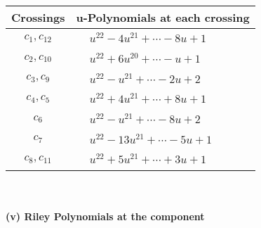 \documentclass[1p]{elsarticle_modified}
\theoremstyle{definition}
\begin{document}
\begin{tabular}{m{50pt}|m{274pt}}
Crossings & \hspace{64pt}u-Polynomials at each crossing \\
\hline $$\begin{aligned}c_{1},c_{12}\end{aligned}$$&$\begin{aligned}
&u^{22}-4 u^{21}+\cdots-8 u+1
\end{aligned}$\\
\hline $$\begin{aligned}c_{2},c_{10}\end{aligned}$$&$\begin{aligned}
&u^{22}+6 u^{20}+\cdots- u+1
\end{aligned}$\\
\hline $$\begin{aligned}c_{3},c_{9}\end{aligned}$$&$\begin{aligned}
&u^{22}- u^{21}+\cdots-2 u+2
\end{aligned}$\\
\hline $$\begin{aligned}c_{4},c_{5}\end{aligned}$$&$\begin{aligned}
&u^{22}+4 u^{21}+\cdots+8 u+1
\end{aligned}$\\
\hline $$\begin{aligned}c_{6}\end{aligned}$$&$\begin{aligned}
&u^{22}- u^{21}+\cdots-8 u+2
\end{aligned}$\\
\hline $$\begin{aligned}c_{7}\end{aligned}$$&$\begin{aligned}
&u^{22}-13 u^{21}+\cdots-5 u+1
\end{aligned}$\\
\hline $$\begin{aligned}c_{8},c_{11}\end{aligned}$$&$\begin{aligned}
&u^{22}+5 u^{21}+\cdots+3 u+1
\end{aligned}$\\
\hline
\end{tabular}\\~\\
\newpage\renewcommand{\arraystretch}{1}
\flushleft \textbf{(v) Riley Polynomials at the component}\newline \\
\end{document}
